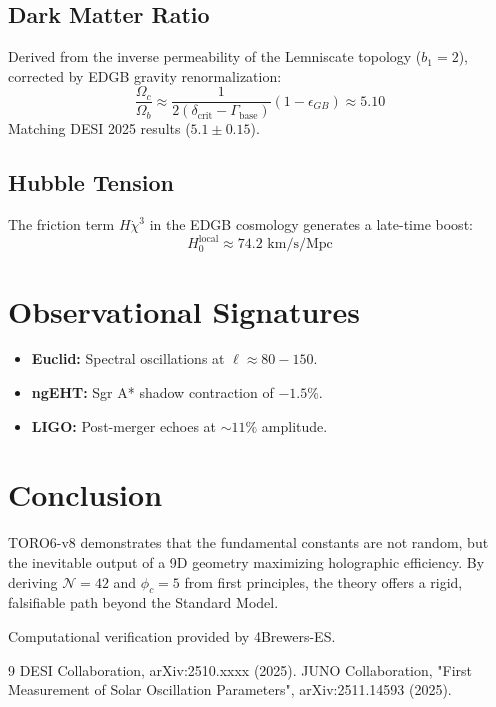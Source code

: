 \documentclass[aps,prd,twocolumn,superscriptaddress,showpacs,amsmath,amssymb,floatfix,nofootinbib]{revtex4-2}
\newcommand{\Tension}{\Gamma_{\mathrm{base}}}
\newcommand{\Threshold}{\delta_{\mathrm{crit}}}
\begin{document}
\subsection{Dark Matter Ratio}
Derived from the inverse permeability of the Lemniscate topology ($b_1=2$), corrected by EDGB gravity renormalization:
\begin{equation}
\frac{\Omega_c}{\Omega_b} \approx \frac{1}{2(\Threshold - \Tension)} (1 - \epsilon_{GB}) \approx \mathbf{5.10}
\end{equation}
Matching DESI 2025 results ($5.1 \pm 0.15$).

\subsection{Hubble Tension}
The friction term $H\dot{\chi}^3$ in the EDGB cosmology generates a late-time boost:
\begin{equation}
H_0^{\text{local}} \approx 74.2 \text{ km/s/Mpc}
\end{equation}

\section{Observational Signatures}

\begin{itemize}
    \item \textbf{Euclid:} Spectral oscillations at $\ell \approx 80-150$.
    \item \textbf{ngEHT:} Sgr A* shadow contraction of $-1.5\%$.
    \item \textbf{LIGO:} Post-merger echoes at $\sim 11\%$ amplitude.
\end{itemize}

\section{Conclusion}
TORO6-v8 demonstrates that the fundamental constants are not random, but the inevitable output of a 9D geometry maximizing holographic efficiency. By deriving $\mathcal{N}=42$ and $\phi_c=5$ from first principles, the theory offers a rigid, falsifiable path beyond the Standard Model.

\begin{acknowledgments}
Computational verification provided by 4Brewers-ES.
\end{acknowledgments}

\begin{thebibliography}{9}
 DESI Collaboration, arXiv:2510.xxxx (2025).
 JUNO Collaboration, "First Measurement of Solar Oscillation Parameters", arXiv:2511.14593 (2025).
\end{thebibliography}
\end{document}
